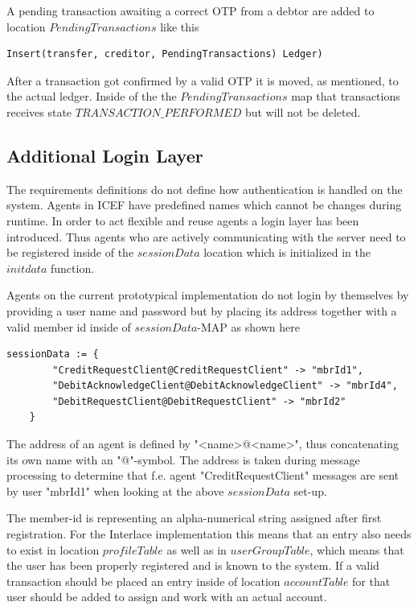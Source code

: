 A pending transaction awaiting a correct OTP from a debtor are added to location $PendingTransactions$ like this

\begin{lstlisting}[language=bsl]
	Insert(transfer, creditor, PendingTransactions) Ledger)
\end{lstlisting}

After a transaction got confirmed by a valid OTP it is moved, as mentioned, to the actual ledger. Inside of the the $PendingTransactions$ map that transactions receives state $TRANSACTION\_PERFORMED$ but will not be deleted.

\subsection{Additional Login Layer}
\label{subsec:impl-login-layer}

The requirements definitions do not define how authentication is handled on the system. Agents in ICEF have predefined names which cannot be changes during runtime. In order to act flexible and reuse agents a login layer has been introduced. Thus agents who are actively communicating with the server need to be registered inside of the $sessionData$ location which is initialized in the $initdata$ function.

Agents on the current prototypical implementation do not login by themselves by providing a user name and password but by placing its address together with a valid member id inside of $sessionData$-MAP as shown here

\begin{lstlisting}[language=bsl]
	sessionData := {
		"CreditRequestClient@CreditRequestClient" -> "mbrId1",
		"DebitAcknowledgeClient@DebitAcknowledgeClient" -> "mbrId4",
		"DebitRequestClient@DebitRequestClient" -> "mbrId2"
	}
\end{lstlisting}

The address of an agent is defined by "<name>@<name>", thus concatenating its own name with an "@"-symbol. The address is taken during message processing to determine that f.e. agent "CreditRequestClient" messages are sent by user "mbrId1" when looking at the above $sessionData$ set-up.

The member-id is representing an alpha-numerical string assigned after first registration. For the Interlace implementation this means that an entry also needs to exist in location $profileTable$ as well as in $userGroupTable$, which means that the user has been properly registered and is known to the system. If a valid transaction should be placed an entry inside of location $accountTable$ for that user should be added to assign and work with an actual account.

